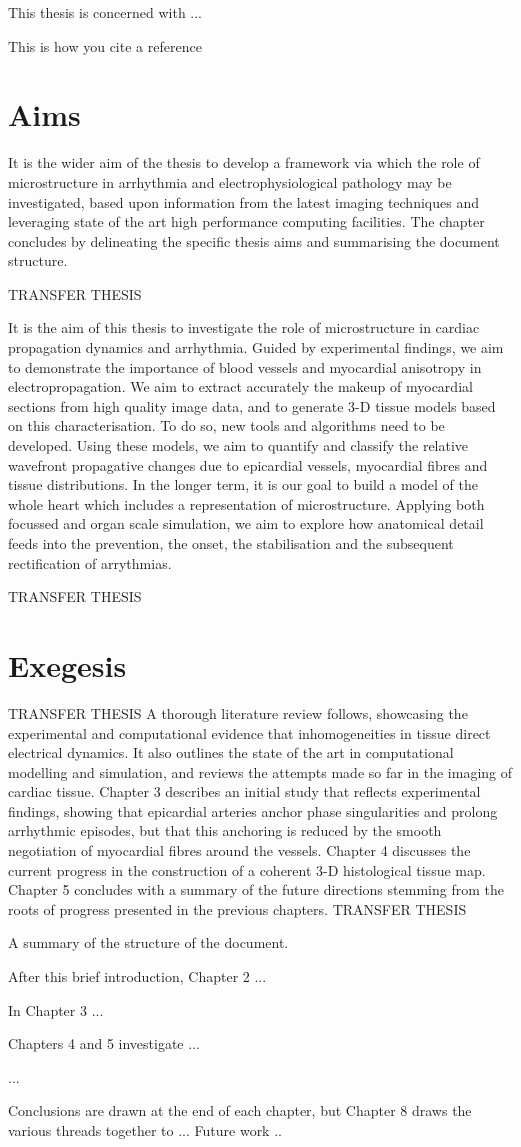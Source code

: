 This thesis is concerned with ...

This is how you cite a reference \cite{citeulike:1448130}

\section{Aims}
\label{sec:intro:aims}
It is the wider aim of the thesis to develop a framework via which the role of microstructure in arrhythmia and electrophysiological pathology may be investigated, based upon information from the latest imaging techniques and leveraging state of the art high performance computing facilities. The chapter concludes by delineating the specific thesis aims and summarising the document structure.

TRANSFER THESIS


It is the aim of this thesis to investigate the role of microstructure in cardiac propagation dynamics and arrhythmia. Guided by experimental findings, we aim to demonstrate the importance of blood vessels and myocardial anisotropy in electropropagation. We aim to extract accurately the makeup of myocardial sections from high quality image data, and to generate 3-D tissue models based on this characterisation. To do so, new tools and algorithms need to be developed. Using these models, we aim to quantify and classify the relative wavefront propagative changes due to epicardial vessels, myocardial fibres and tissue distributions. In the longer term, it is our goal to build a model of the whole heart which includes a representation of microstructure. Applying both focussed and organ scale simulation, we aim to explore how anatomical detail feeds into the prevention, the onset, the stabilisation and the subsequent rectification of arrythmias.

TRANSFER THESIS

\section{Exegesis}
\label{sec:intro:exegesis}
TRANSFER THESIS
 A thorough literature review follows, showcasing the experimental and computational evidence that inhomogeneities in tissue direct electrical dynamics. It also outlines the state of the art in computational modelling and simulation, and reviews the attempts made so far in the imaging of cardiac tissue. Chapter 3 describes an initial study that reflects experimental findings, showing that epicardial arteries anchor phase singularities and prolong arrhythmic episodes, but that this anchoring is reduced by the smooth negotiation of myocardial fibres around the vessels. Chapter 4 discusses the current progress in the construction of a coherent 3-D histological tissue map. Chapter 5 concludes with a summary of the future directions stemming from the roots of progress presented in the previous chapters.
TRANSFER THESIS


A summary of the structure of the document.

After this brief introduction, Chapter 2 ...

In Chapter 3 ...

Chapters 4 and 5 investigate ...

...

Conclusions are drawn at the end of each chapter,
but Chapter 8 draws the various threads together to ...
Future work ..


